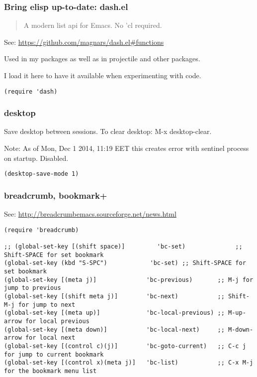\documentclass[nofonts]{tufte-handout}
\begin{document}
\subsubsection{Bring elisp up-to-date: dash.el}
\label{sec-1-11-3}

\begin{quote}
A modern list api for Emacs. No 'cl required.
\end{quote}

See: \url{https://github.com/magnars/dash.el#functions}

Used in my packages as well as in projectile and other packages.

I load it here to have it available when experimenting with code.

\begin{verbatim}
(require 'dash)
\end{verbatim}
\subsubsection{desktop}
\label{sec-1-11-4}

Save desktop between sessions.  To clear desktop: M-x desktop-clear.

Note: As of Mon, Dec  1 2014, 11:19 EET this creates error with sentinel process on startup.  Disabled.

\begin{verbatim}
(desktop-save-mode 1)
\end{verbatim}

\subsubsection{breadcrumb, bookmark+}
\label{sec-1-11-5}

See: \url{http://breadcrumbemacs.sourceforge.net/news.html}

\begin{verbatim}
(require 'breadcrumb)

;; (global-set-key [(shift space)]         'bc-set)              ;; Shift-SPACE for set bookmark
(global-set-key (kbd "S-SPC")            'bc-set) ;; Shift-SPACE for set bookmark
(global-set-key [(meta j)]              'bc-previous)       ;; M-j for jump to previous
(global-set-key [(shift meta j)]        'bc-next)           ;; Shift-M-j for jump to next
(global-set-key [(meta up)]             'bc-local-previous) ;; M-up-arrow for local previous
(global-set-key [(meta down)]           'bc-local-next)     ;; M-down-arrow for local next
(global-set-key [(control c)(j)]        'bc-goto-current)   ;; C-c j for jump to current bookmark
(global-set-key [(control x)(meta j)]   'bc-list)           ;; C-x M-j for the bookmark menu list
\end{verbatim}
\end{document}
